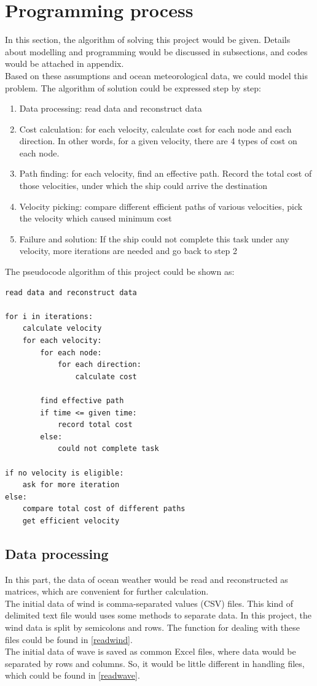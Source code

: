 \section{Programming process}
In this section, the algorithm of solving this project would be given. Details about modelling and programming would be discussed in subsections, and codes would be attached in appendix.
\\Based on these assumptions and ocean meteorological data, we could model this problem. The algorithm of solution could be expressed step by step:
\begin{enumerate}[step 1]
    \item Data processing: read data and reconstruct data
    \item Cost calculation: for each velocity, calculate cost for each node and each direction. In other words, for a given velocity, there are 4 types of cost on each node.
    \item Path finding: for each velocity, find an effective path. Record the total cost of those velocities, under which the ship could arrive the destination
    \item Velocity picking: compare different efficient paths of various velocities, pick the velocity which caused minimum cost
    \item Failure and solution: If the ship could not complete this task under any velocity, more iterations are needed and go back to step 2
\end{enumerate}
The pseudocode algorithm of this project could be shown as:
\begin{lstlisting}[caption= Pseudocode algorithm of project,label=program]
read data and reconstruct data

for i in iterations:
    calculate velocity
    for each velocity:
        for each node:
            for each direction:
                calculate cost

        find effective path
        if time <= given time:
            record total cost
        else:
            could not complete task

if no velocity is eligible:
    ask for more iteration
else:
    compare total cost of different paths
    get efficient velocity
\end{lstlisting}
\subsection{Data processing}
\label{Data processing}
In this part, the data of ocean weather would be read and reconstructed as matrices, which are convenient for further calculation.
\\The initial data of wind is comma-separated values (CSV) files. This kind of delimited text file would uses some methods to separate data. In this project, the wind data is split by semicolons and rows. The function for dealing with these files could be found in \autoref{readwind}.
\\The initial data of wave is saved as common Excel files, where data would be separated by rows and columns. So, it would be little different in handling files, which could be found in \autoref{readwave}.

